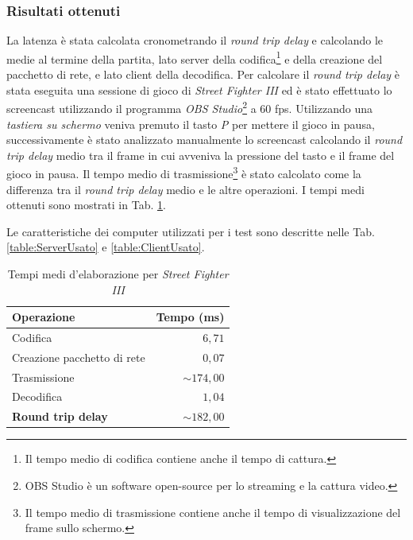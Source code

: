 \subsubsection{Risultati ottenuti}
La latenza è stata calcolata cronometrando il \textit{round trip delay} e calcolando le medie al termine della partita, lato server della codifica\footnote{Il tempo medio di codifica contiene anche il tempo di cattura.} e della creazione del pacchetto di rete, e lato client della decodifica. Per calcolare il \textit{round trip delay} è stata eseguita una sessione di gioco di \textit{Street Fighter III} ed è stato effettuato lo screencast utilizzando il programma \textit{OBS Studio}\footnote{OBS Studio è un software open-source per lo streaming e la cattura video.} a 60 fps. Utilizzando una \textit{tastiera su schermo} veniva premuto il tasto \textit{P} per mettere il gioco in pausa, successivamente è stato analizzato manualmente lo screencast calcolando il \textit{round trip delay} medio tra il frame in cui avveniva la pressione del tasto e il frame del gioco in pausa. Il tempo medio di trasmissione\footnote{Il tempo medio di trasmissione contiene anche il tempo di visualizzazione del frame sullo schermo.} è stato calcolato come la differenza tra il \textit{round trip delay} medio e le altre operazioni. I tempi medi ottenuti sono mostrati in Tab. \ref{table:LatenzaOttenuta}.

Le caratteristiche dei computer utilizzati per i test sono descritte nelle Tab. \ref{table:ServerUsato} e \ref{table:ClientUsato}.

\begin{table}[H]
	\centering
	\begin{tabular}{||l r||}
		\hline
		Operazione & Tempo (ms) \\
		\hline\hline				
		\hline
		Codifica & $6,71$ \\
		\hline
		Creazione pacchetto di rete & $0,07$ \\
		\hline
		Trasmissione & $\sim 174,00$ \\
		\hline
		Decodifica & $1,04$ \\
		\hline\hline
		\textbf{Round trip delay} & \textbf{$\sim 182,00$} \\
		\hline
	\end{tabular}

	\caption{Tempi medi d'elaborazione per \textit{Street Fighter III}}
	\label{table:LatenzaOttenuta}
\end{table}

